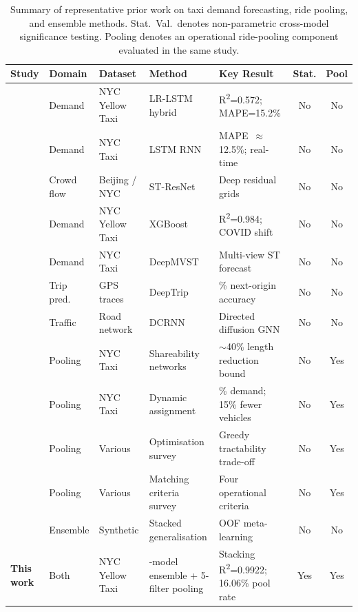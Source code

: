 \begin{table}[t]
\centering
\caption{Summary of representative prior work on taxi demand forecasting, ride pooling, and ensemble methods. Stat.\ Val.\ denotes non-parametric cross-model significance testing. Pooling denotes an operational ride-pooling component evaluated in the same study.\label{tab:litreview}}
\small
\begin{tabularx}{\textwidth}{@{}
 >{\raggedright\arraybackslash}p{2.7cm}
 >{\raggedright\arraybackslash}p{1.4cm}
 >{\raggedright\arraybackslash}p{1.9cm}
 >{\raggedright\arraybackslash}p{2.2cm}
 >{\raggedright\arraybackslash}X
 c c @{}}
\toprule
\textbf{Study} & \textbf{Domain} & \textbf{Dataset} & \textbf{Method} & \textbf{Key Result} & \textbf{Stat.} & \textbf{Pool} \\
\midrule
\textcite{kim2020hybrid} & Demand & NYC Yellow Taxi & LR-LSTM hybrid & R\textsuperscript{2}=0.572; MAPE=15.2\% & No & No \\
\textcite{xu2017realtime} & Demand & NYC Taxi & LSTM RNN & MAPE~$\approx$12.5\%; real-time & No & No \\
\textcite{zhang2017deep} & Crowd flow & Beijing / NYC & ST-ResNet & Deep residual grids & No & No \\
\textcite{liu2021epidemic} & Demand & NYC Yellow Taxi & XGBoost & R\textsuperscript{2}=0.984; COVID shift & No & No \\
\textcite{yao2018deeptraffic} & Demand & NYC Taxi & DeepMVST & Multi-view ST forecast & No & No \\
\textcite{zhang2023deeptrip} & Trip pred. & GPS traces & DeepTrip & 81\% next-origin accuracy & No & No \\
\textcite{li2018diffusion} & Traffic & Road network & DCRNN & Directed diffusion GNN & No & No \\
\textcite{santi2014quantifying} & Pooling & NYC Taxi & Shareability networks & $\sim$40\% length reduction bound & No & Yes \\
\textcite{alonso2017demand} & Pooling & NYC Taxi & Dynamic assignment & 98\% demand; 15\% fewer vehicles & No & Yes \\
\textcite{agatz2012ridesharing} & Pooling & Various & Optimisation survey & Greedy tractability trade-off & No & Yes \\
\textcite{furuhata2013ridesharing} & Pooling & Various & Matching criteria survey & Four operational criteria & No & Yes \\
\textcite{wolpert1992stacking} & Ensemble & Synthetic & Stacked generalisation & OOF meta-learning & No & No \\
\textbf{This work} & Both & NYC Yellow Taxi & 14-model ensemble + 5-filter pooling & Stacking R\textsuperscript{2}=0.9922; 16.06\% pool rate & Yes & Yes \\
\bottomrule
\end{tabularx}
\end{table}

